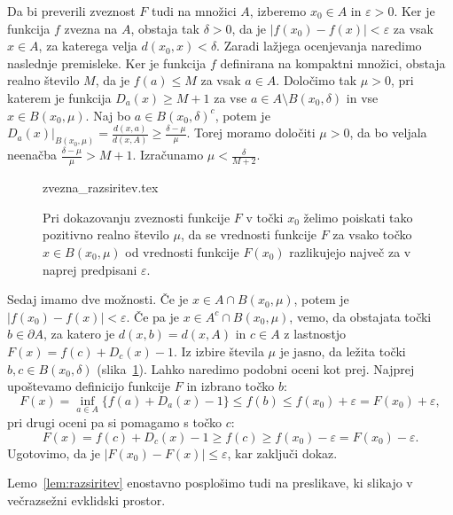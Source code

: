 \documentclass[mat1]{fmfdelo}
\newcommand{\0}{\underline{0}}
\begin{document}
\begin{dokaz}
Da bi preverili zveznost $F$ tudi na množici $A$, izberemo $x_0 \in A$ in $\varepsilon > 0$. Ker je funkcija $f$ zvezna na $A$, obstaja tak $\delta > 0$, da je $|f(x_0) - f(x)| < \varepsilon$ za vsak $x \in A$, za katerega velja $d(x_0, x) < \delta$. Zaradi lažjega ocenjevanja naredimo naslednje premisleke. Ker je funkcija $f$ definirana na kompaktni množici, obstaja realno število $M$, da je $f(a) \leq M$ za vsak $a \in A$. Določimo tak $\mu >0$, pri katerem je funkcija $D_a(x) \geq M + 1$ za vse $a \in A \setminus B(x_0, \delta)$ in vse $x \in B(x_0, \mu)$. Naj bo $a \in B(x_0, \delta)^c$, potem je
$D_a(x)|_{B(x_0, \mu)}= \frac{d(x, a)}{d(x, A)} \geq \frac{\delta - \mu}{\mu}$. Torej moramo določiti $\mu > 0$, da bo veljala neenačba $\frac{\delta - \mu}{\mu} > M + 1$. Izračunamo $\mu <\frac{\delta}{M + 2}$.
\begin{figure}[h!]
	\centering
{zvezna_razsiritev.tex}
	\caption{Pri dokazovanju zveznosti funkcije $F$ v točki $x_0$ želimo poiskati tako pozitivno realno število $\mu$, da se vrednosti funkcije $F$ za vsako točko $x \in B(x_0, \mu)$ od vrednosti funkcije $F(x_0)$ razlikujejo največ za v naprej predpisani $\varepsilon$.}\label{fig:zveznarazsiritev}
\end{figure}
Sedaj imamo dve možnosti. Če je $x \in A \cap B(x_0, \mu)$, potem je $|f(x_0) - f(x)| < \varepsilon$. Če pa je $x \in A^c \cap B(x_0, \mu)$, vemo, da obstajata točki $b \in \partial A$, za katero je $d(x, b) = d(x, A)$ in $c \in A $ z lastnostjo $F(x) = f(c) + D_c(x) -1$. Iz izbire števila $\mu$ je jasno, da ležita točki $b, c \in B(x_0, \delta)$ (slika~\ref{fig:zveznarazsiritev}). Lahko naredimo podobni oceni kot prej. Najprej upoštevamo definicijo funkcije $F$ in izbrano točko $b$:
\begin{equation*}
F(x) = \inf_{a \in A} \{ f(a) + D_a(x) - 1\} \leq f(b) \leq f(x_0) +\varepsilon = F(x_0) +\varepsilon,
\end{equation*}
pri drugi oceni pa si pomagamo s točko $c$:
\begin{equation*}
F(x) = f(c) + D_c(x) -1 \geq f(c) \geq f(x_0) - \varepsilon =  F(x_0) -\varepsilon.
\end{equation*}
Ugotovimo, da je $| F(x_0) - F(x) | \leq \varepsilon$, kar zaključi dokaz.
\end{dokaz}

Lemo~\ref{lem:razsiritev} enostavno posplošimo tudi na preslikave, ki slikajo v večrazsežni evklidski prostor.
\end{document}
